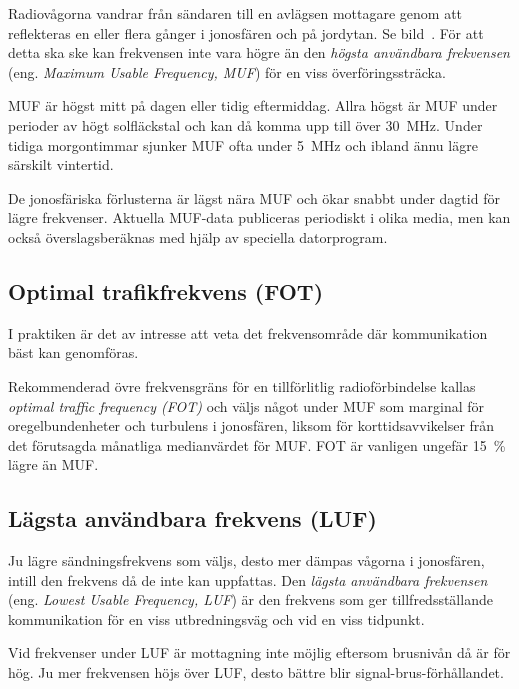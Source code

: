 Radiovågorna vandrar från sändaren till en avlägsen mottagare genom att
reflekteras en eller flera gånger i jonosfären och på jordytan.
Se bild~.
För att detta ska ske kan frekvensen inte vara högre än den
\emph{högsta användbara frekvensen} (eng. \emph{Maximum Usable Frequency, MUF})
för en viss överföringssträcka.

MUF är högst mitt på dagen eller tidig eftermiddag.
Allra högst är MUF under perioder av högt solfläckstal och kan då komma
upp till över \qty{30}{\mega\hertz}.
Under tidiga morgontimmar sjunker MUF ofta under \qty{5}{\mega\hertz} och ibland
ännu lägre särskilt vintertid.

De jonosfäriska förlusterna är lägst nära MUF och ökar snabbt under
dagtid för lägre frekvenser.
Aktuella MUF-data publiceras periodiskt i olika media, men kan också
överslagsberäknas med hjälp av speciella datorprogram.

\subsection{Optimal trafikfrekvens (FOT)}

I praktiken är det av intresse att veta det frekvensområde där
kommunikation bäst kan genomföras.

Rekommenderad övre frekvensgräns för en tillförlitlig radioförbindelse
kallas \emph{optimal traffic frequency (FOT)} och väljs något under
MUF som marginal för oregelbundenheter och turbulens i jonosfären,
liksom för korttidsavvikelser från det förutsagda månatliga
medianvärdet för MUF.
FOT är vanligen ungefär \qty{15}{\percent} lägre än MUF.

\newpage
\subsection{Lägsta användbara frekvens (LUF)}

Ju lägre sändningsfrekvens som väljs, desto mer dämpas vågorna i
jonosfären, intill den frekvens då de inte kan uppfattas.
Den \emph{lägsta användbara frekvensen}
(eng. \emph{Lowest Usable Frequency, LUF}) är den
frekvens som ger tillfredsställande kommunikation för en viss
utbredningsväg och vid en viss tidpunkt.

Vid frekvenser under LUF är mottagning inte möjlig eftersom brusnivån
då är för hög.
Ju mer frekvensen höjs över LUF, desto bättre blir signal-brus-förhållandet.

